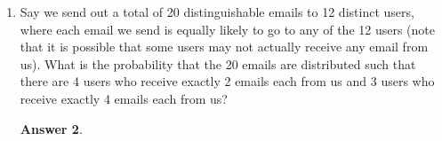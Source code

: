 \documentclass[12pt]{article}
\renewcommand{\(}{\left(}
\renewcommand{\)}{\right)}
\theoremstyle{definition}
\newtheorem*{answer}{Answer}
\begin{document}
\begin{enumerate}
    \begin{shaded}
    \begin{answer}

    \end{answer}
    \end{shaded}
    \newpage


\item Say we send out a total of 20 distinguishable emails to 12 distinct users, where each email we send is equally likely to go to any of the 12 users (note that it is possible that some users may not actually receive any email from us).  What is the probability that the 20 emails are distributed such that there are 4 users who receive exactly 2 emails each from us and 3 users who receive exactly 4 emails each from us?

    \begin{shaded}
    \begin{answer}

    \end{answer}
    \end{shaded}
    \newpage

\end{enumerate}
\end{document}
